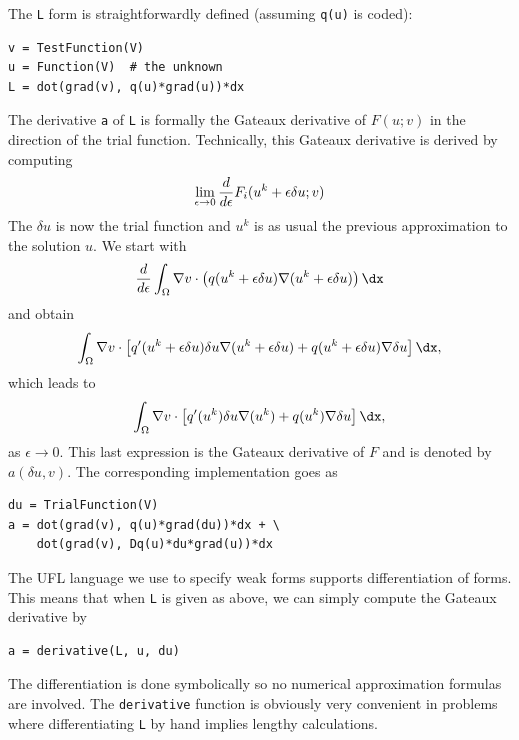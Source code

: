 The {\fontsize{12pt}{12pt}\texttt{L}} form is straightforwardly defined (assuming {\fontsize{12pt}{12pt}\texttt{q(u)}} is
coded):
\begin{Verbatim}[fontsize=\fontsize{10pt}{10pt},tabsize=8,baselinestretch=1.05,
fontfamily=tt,xleftmargin=7mm]
v = TestFunction(V)
u = Function(V)  # the unknown
L = dot(grad(v), q(u)*grad(u))*dx
\end{Verbatim}
\noindent

The derivative {\fontsize{12pt}{12pt}\texttt{a}} of {\fontsize{12pt}{12pt}\texttt{L}} is formally the
Gateaux derivative of $F(u;v)$ in the direction of the trial function.
Technically, this Gateaux derivative is derived by computing
\begin{equation}
\lim_{\epsilon\rightarrow 0}{d\over d\epsilon} F_i(u^k + \epsilon\delta u; v)
\label{langtangen:poisson:nonlinear:Gateaux1}
\end{equation}
The $\delta u$ is now the trial function and $u^k$ is as usual the previous
approximation to the solution $u$.
We start with
\[
{d\over d\epsilon}\int_\Omega \nabla v\cdot\left( q(u^k + \epsilon\delta u)
\nabla (u^k + \epsilon\delta u)\right)\dx
\]
and obtain
\[
\int_\Omega \nabla v\cdot\left\lbrack
q'(u^k + \epsilon\delta u)\delta u
\nabla (u^k + \epsilon\delta u)
+
q(u^k + \epsilon\delta u)
\nabla \delta u
\right\rbrack\dx,
\]
which leads to
\begin{equation}
\int_\Omega \nabla v\cdot\left\lbrack
q'(u^k)\delta u
\nabla (u^k)
+
q(u^k)
\nabla \delta u
\right\rbrack\dx,
\end{equation}
as $\epsilon\rightarrow 0$.
This last expression is the Gateaux derivative of $F$ and is denoted
by $a(\delta u, v)$.
The corresponding implementation goes as
\begin{Verbatim}[fontsize=\fontsize{10pt}{10pt},tabsize=8,baselinestretch=1.05,
fontfamily=tt,xleftmargin=7mm]
du = TrialFunction(V)
a = dot(grad(v), q(u)*grad(du))*dx + \
    dot(grad(v), Dq(u)*du*grad(u))*dx
\end{Verbatim}
\noindent

The UFL language we use to specify weak forms supports differentiation
of forms. This means that when {\fontsize{12pt}{12pt}\texttt{L}} is given as above, we can simply
compute the Gateaux derivative by
\begin{Verbatim}[fontsize=\fontsize{10pt}{10pt},tabsize=8,baselinestretch=1.05,
fontfamily=tt,xleftmargin=7mm]
a = derivative(L, u, du)
\end{Verbatim}
\noindent
The differentiation is done symbolically so no numerical approximation
formulas are involved. The {\fontsize{12pt}{12pt}\texttt{derivative}} function is obviously
very convenient in problems where differentiating {\fontsize{12pt}{12pt}\texttt{L}} by hand
implies lengthy calculations.

